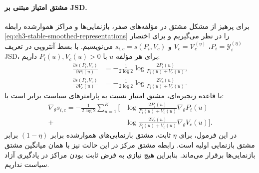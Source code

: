 \paragraph{مشتق امتیاز مبتنی بر JSD.}
برای پرهیز از مشکل مشتق
در مؤلفه‌های صفر،
بازنمایی‌ها و مراکز
هموارشده رابطه
\eqref{eq:ch3-stable-smoothed-representations}
را در نظر می‌گیریم و
برای اختصار
$P_i=\mathscr Y_i^{(\eta)}$،
$V_c=\mathcal V_c^{(\eta)}$
و $s_{i,c}=s(P_i,V_c)$
می‌نویسیم. با بسط
آنتروپی در تعریف JSD،
برای هر مؤلفه $u$ با
$P_i(u),V_c(u)>0$ داریم:
\begin{equation}\label{eq:ch3-margin-JS-partials}
\boxed{
\begin{aligned}
\frac{\partial s(P_i,V_c)}{\partial P_i(u)}
&=-\frac1{2\log2}
\log\frac{2P_i(u)}{P_i(u)+V_c(u)},\\
\frac{\partial s(P_i,V_c)}{\partial V_c(u)}
&=-\frac1{2\log2}
\log\frac{2V_c(u)}{P_i(u)+V_c(u)}.
\end{aligned}}
\end{equation}
با قاعده زنجیره‌ای،
مشتق امتیاز نسبت به
پارامترهای سیاست برابر است با:
\begin{equation}\label{eq:ch3-margin-score-policy-gradient}
\boxed{
\begin{aligned}
\nabla_\theta s_{i,c}
=-\frac1{2\log2}\sum_{u=1}^{K}
\Bigg[
&\log\frac{2P_i(u)}{P_i(u)+V_c(u)}
\nabla_\theta P_i(u)\\
+&\log\frac{2V_c(u)}{P_i(u)+V_c(u)}
\nabla_\theta V_c(u)
\Bigg].
\end{aligned}}
\end{equation}
در این فرمول، برای $\eta$
ثابت، مشتق بازنمایی‌های
هموارشده برابر
$(1-\eta)$ برابر مشتق
بازنمایی اولیه است.
رابطه مشتق مرکز در این
حالت نیز با همان میانگین
مشتق بازنمایی‌ها برقرار
می‌ماند. بنابراین هیچ
نیازی به فرض ثابت بودن
مراکز در یادگیری آزاد
سیاست نداریم.

